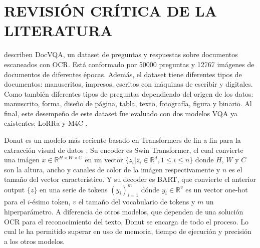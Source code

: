 \documentclass[../main.tex]{subfiles}
\begin{document}
\chapter{REVISIÓN CRÍTICA DE LA LITERATURA}


\citet{mathew2021docvqa} describen DocVQA,
un dataset de preguntas y respuestas sobre documentos escaneados con OCR.
Está conformado por 50000 preguntas y 12767 imágenes de documentos de diferentes épocas.
Además, el dataset tiene diferentes tipos de documentos:
manuscritos, impresos, escritos con máquinas de escribir y digitales.
Como también diferentes tipos de preguntas dependiendo del origen de los datos:
manuscrito, forma, diseño de página, tabla, texto, fotografía, figura y binario.
Al final, este desempeño de este dataset fue evaluado con dos modelos VQA ya existentes:
LoRRa \cite{anderson2018bottomup} y M4C \cite{devlin2019bert}.

%

Donut es un modelo más reciente basado en Transformers de fin a fin para la extracción visual de datos \cite{kim2022ocrfree}.
Su encoder es Swin Transformer\cite{9710580}, el cual convierte una imágen $x \in \mathbb{R}^{H\times W \times C}$ en un vector $\{z_i|z_i\in\mathbb{R}^d,1\leq i \leq n\}$ donde $H$, $W$ y $C$ son la altura, ancho y canales de color de la imágen respectivamente y $n$ es el tamaño del vector característico.
Y su decoder es BART\cite{lewis-etal-2020-bart}, que convierte el anterior output $\{z\}$ en una serie de tokens $(y_i)^m_{i=1}$ dónde $y_i\in\mathbb{R}^v$ es un vector one-hot para el $i$-ésimo token, $v$ el tamaño del vocabulario de tokens y $m$ un hiperparámetro.
A diferencia de otros modelos, que dependen de una solución OCR para el reconocimiento del texto,
Donut se encarga de todo el proceso.
Lo cual le ha permitido superar en uso de memoria, tiempo de ejecución y precisión a los otros modelos.
\end{document}
